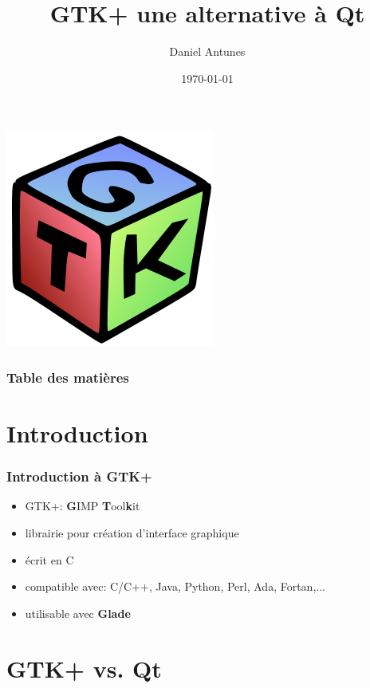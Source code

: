 \documentclass{beamer}
\title{GTK+ une alternative à Qt}
\author{Daniel Antunes}
\date{\today}
\begin{document}
\begin{frame}
  \begin{center}
  \includegraphics[scale=0.39]{logo.png}
  \end{center}
  \titlepage
\end{frame}

\begin{frame}
  \frametitle{Table des matières}
  {\small \tableofcontents[hideallsubsections]}
\end{frame}

\section{Introduction}

\begin{frame}
  \frametitle{Introduction à GTK+}
  
  \begin{itemize}
  \item GTK+: \textbf{G}IMP \textbf{T}ool\textbf{k}it
  \item librairie pour création d'interface graphique
  \item écrit en C
  \item compatible avec: C/C++, Java, Python, Perl, Ada, Fortan,...
  \item utilisable avec \textbf{Glade}
  \end{itemize}
  
\end{frame}

\section{GTK+ vs. Qt}
\end{document}
